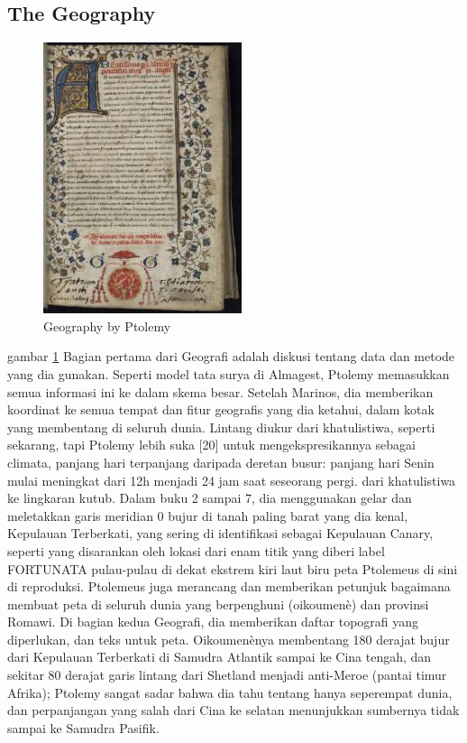   \subsection{The Geography}	
   \begin{figure} [ht]
	\centerline{\includegraphics[width=.5\textwidth]{figures/geography}}
	\caption{Geography by Ptolemy}
	\label{geography}
		\end{figure}
    gambar \ref {geography} Bagian pertama dari Geografi adalah diskusi tentang data dan metode yang dia gunakan. Seperti model tata surya di Almagest, Ptolemy memasukkan semua informasi ini ke dalam skema besar. Setelah Marinos, dia memberikan koordinat ke semua tempat dan fitur geografis yang dia ketahui, dalam kotak yang membentang di seluruh dunia. Lintang diukur dari khatulistiwa, seperti sekarang, tapi Ptolemy lebih suka [20] untuk mengekspresikannya sebagai climata, panjang hari terpanjang daripada deretan busur: panjang hari Senin mulai meningkat dari 12h menjadi 24 jam saat seseorang pergi. dari khatulistiwa ke lingkaran kutub. Dalam buku 2 sampai 7, dia menggunakan gelar dan meletakkan garis meridian 0 bujur di tanah paling barat yang dia kenal, Kepulauan Terberkati, yang sering di identifikasi sebagai Kepulauan Canary, seperti yang disarankan oleh lokasi dari enam titik yang diberi label FORTUNATA pulau-pulau di dekat ekstrem kiri laut biru peta Ptolemeus di sini di reproduksi.
	Ptolemeus juga merancang dan memberikan petunjuk bagaimana membuat peta di seluruh dunia yang berpenghuni (oikoumenè) dan provinsi Romawi. Di bagian kedua Geografi, dia memberikan daftar topografi yang diperlukan, dan teks untuk peta. Oikoumenènya membentang 180 derajat bujur dari Kepulauan Terberkati di Samudra Atlantik sampai ke Cina tengah, dan sekitar 80 derajat garis lintang dari Shetland menjadi anti-Meroe (pantai timur Afrika); Ptolemy sangat sadar bahwa dia tahu tentang hanya seperempat dunia, dan perpanjangan yang salah dari Cina ke selatan menunjukkan sumbernya tidak sampai ke Samudra Pasifik.
